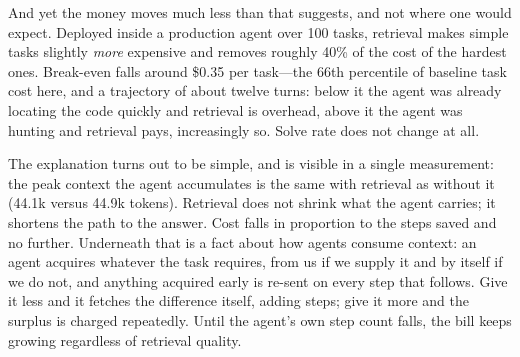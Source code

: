 \documentclass[11pt,letterpaper]{article}
\begin{document}
And yet the money moves much less than that suggests, and not where one would
expect. Deployed inside a production agent over 100 tasks, retrieval makes simple
tasks slightly \emph{more} expensive and removes roughly 40\% of the cost of the
hardest ones. Break-even falls around \$0.35 per task---the 66th percentile of
baseline task cost here, and a trajectory of about twelve turns: below it the agent
was already locating the code quickly and retrieval is overhead, above it the agent
was hunting and retrieval pays, increasingly so. Solve rate does not change at all.

The explanation turns out to be simple, and is visible in a single measurement:
the peak context the agent accumulates is the same with retrieval as without it
(44.1k versus 44.9k tokens). Retrieval does not shrink what the agent carries; it
shortens the path to the answer. Cost falls in proportion to the steps saved and
no further. Underneath that is a fact about how agents consume context: an agent
acquires whatever the task requires, from us if we supply it and by itself if we
do not, and anything acquired early is re-sent on every step that follows. Give
it less and it fetches the difference itself, adding steps; give it more and the
surplus is charged repeatedly. Until the agent's own step count falls, the bill
keeps growing regardless of retrieval quality.
\end{document}
